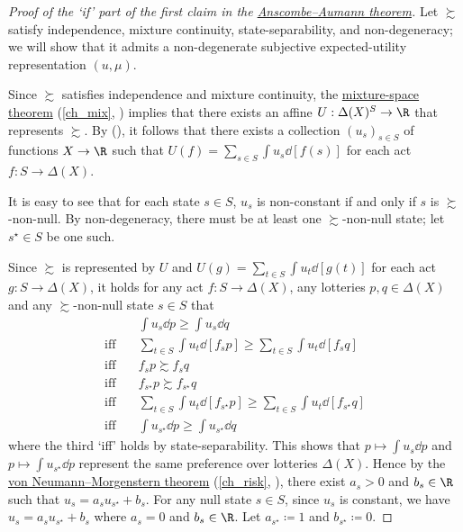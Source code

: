 \begin{proof}[Proof of the `if' part of the first claim in the {\hyperref[theorem:aa]{Anscombe--Aumann theorem}}]
	Let $\succsim$ satisfy independence, mixture continuity, state-separability, and non-degeneracy; we will show that it admits a non-degenerate subjective expected-utility representation $(u,\mu)$.

	Since $\succsim$ satisfies independence and mixture continuity, the \hyperref[theorem:mix]{mixture-space theorem} (\cref{ch_mix}, ) implies that there exists an affine $U : \Delta(X)^S \to \R$ that represents $\succsim$. By \hyperref[exercise:mix_acts_affine]{} (), it follows that there exists a collection $(u_s)_{s \in S}$ of functions $X \to \R$ such that $U(f) = \sum_{s \in S} \int u_s \dd[f(s)]$ for each act $f : S \to \Delta(X)$.

	It is easy to see that for each state $s \in S$, $u_s$ is non-constant if and only if $s$ is $\succsim$-non-null. By non-degeneracy, there must be at least one $\succsim$-non-null state; let $s^\star \in S$ be one such.

	Since $\succsim$ is represented by $U$ and $U(g) = \sum_{t \in S} \int u_t \dd[g(t)]$ for each act $g : S \to \Delta(X)$, it holds for any act $f : S \to \Delta(X)$, any lotteries $p,q \in \Delta(X)$ and any $\succsim$-non-null state $s \in S$ that
	\begin{align*}
		&\int u_s \dd p \geq \int u_s \dd q
		\\
		\text{iff} \quad
		&\sum_{t \in S} \int u_t \dd [f_s p] \geq \sum_{t \in S} \int u_t \dd [f_s q]
		\\
		\text{iff} \quad
		&f_s p \succsim f_s q
		\\
		\text{iff} \quad
		&f_{s^\star} p \succsim f_{s^\star} q
		\\
		\text{iff} \quad
		&\sum_{t \in S} \int u_t \dd [f_{s^\star} p] \geq \sum_{t \in S} \int u_t \dd [f_{s^\star} q]
		\\
		\text{iff} \quad
		&\int u_{s^\star} \dd p \geq \int u_{s^\star} \dd q
	\end{align*}
	where the third `iff' holds by state-separability. This shows that $p \mapsto \int u_s \dd p$ and $p \mapsto \int u_{s^\star} \dd p$ represent the same preference over lotteries $\Delta(X)$. Hence by the \hyperref[theorem:vNM]{von Neumann--Morgenstern theorem} (\cref{ch_risk}, ), there exist $a_s > 0$ and $b_s \in \R$ such that $u_s = a_s u_{s^\star} + b_s$. For any null state $s \in S$, since $u_s$ is constant, we have $u_s = a_s u_{s^\star} + b_s$ where $a_s=0$ and $b_s \in \R$. Let $a_{s^\star} \coloneqq 1$ and $b_{s^\star} \coloneqq 0$.


\end{proof}

